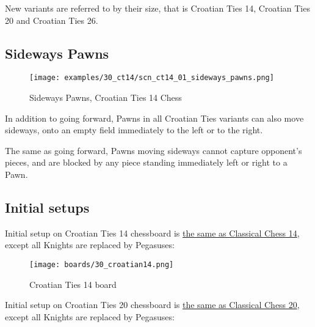 New variants are referred to by their size, that is Croatian Ties 14, Croatian
Ties 20 and Croatian Ties 26.

\subsection*{Sideways Pawns}
\label{sec:Simple variants/Croatian Ties variants/Sideways Pawns}

\noindent
\begin{wrapfigure}{l}{0.4\textwidth}
\centering
\texttt{[image: examples/30\_ct14/scn\_ct14\_01\_sideways\_pawns.png]}
\caption{Sideways Pawns, Croatian Ties 14 Chess}
\label{fig:scn_ct14_01_sideways_pawns}
\end{wrapfigure}
In addition to going forward, Pawns in all Croatian Ties variants can also move
sideways, onto an empty field immediately to the left or to the right.

The same as going forward, Pawns moving sideways cannot capture opponent's pieces,
and are blocked by any piece standing immediately left or right to a Pawn.

\vfill{}

\clearpage %

\subsection*{Initial setups}
\label{sec:Simple variants/Croatian Ties variants/Initial setups}

Initial setup on Croatian Ties 14 chessboard is
\hyperref[fig:24_classic14]{the same as Classical Chess 14}, except all Knights
are replaced by Pegasuses:

\noindent
\begin{figure}[h]
\texttt{[image: boards/30\_croatian14.png]}
\caption{Croatian Ties 14 board}
\label{fig:30_croatian14}
\end{figure}

\vfill{}

\clearpage %


Initial setup on Croatian Ties 20 chessboard is
\hyperref[fig:26_classic20]{the same as Classical Chess 20}, except all Knights
are replaced by Pegasuses:

